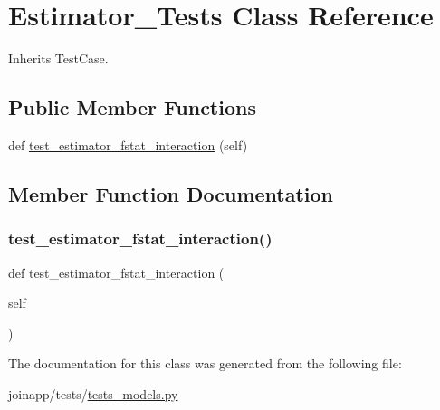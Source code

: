 \hypertarget{classtests__models_1_1_estimator___tests}{}\section{Estimator\+\_\+\+Tests Class Reference}
\label{classtests__models_1_1_estimator___tests}


Inherits Test\+Case.

\subsection*{Public Member Functions}
\begin{DoxyCompactItemize}
\item 
def \mbox{\hyperlink{classtests__models_1_1_estimator___tests_af50e64ff84b21c0bb1399668efd9f96d}{test\+\_\+estimator\+\_\+fstat\+\_\+interaction}} (self)
\end{DoxyCompactItemize}


\subsection{Member Function Documentation}
\mbox{\label{classtests__models_1_1_estimator___tests_af50e64ff84b21c0bb1399668efd9f96d}} 
\subsubsection{\texorpdfstring{test\_estimator\_fstat\_interaction()}{test\_estimator\_fstat\_interaction()}}
{\footnotesize\ttfamily def test\+\_\+estimator\+\_\+fstat\+\_\+interaction (\begin{DoxyParamCaption}\item[{}]{self }\end{DoxyParamCaption})}



The documentation for this class was generated from the following file\+:\begin{DoxyCompactItemize}
\item 
joinapp/tests/\mbox{\hyperlink{tests__models_8py}{tests\+\_\+models.\+py}}\end{DoxyCompactItemize}
